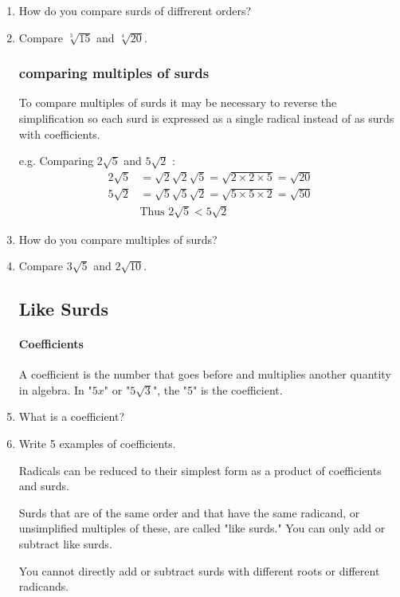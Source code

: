 \documentclass{article}
\begin{document}
\begin{enumerate}
\item How do you compare surds of diffrerent orders?
\item Compare $\sqrt[3]{15}$ and $\sqrt[4]{20}$.

\subsubsection*{comparing multiples of surds}
To compare multiples of surds it may be necessary to reverse the simplification so each surd is expressed as a single radical instead of as surds with coefficients.

e.g. Comparing $2\sqrt{5}$ and $5\sqrt{2}$ :
\begin{align*}
2\sqrt{5}&=\sqrt{2}\sqrt{2}\sqrt{5}=\sqrt{2\times2\times5}=\sqrt{20}\\
5\sqrt{2}&=\sqrt{5}\sqrt{5}\sqrt{2}=\sqrt{5\times{5\times{2}}}=\sqrt{50}\\
&\text{Thus }2\sqrt{5}<5\sqrt{2}
\end{align*}

\item How do you compare multiples of surds?
\item Compare $3\sqrt{5}$ and $2\sqrt{10}$.

\subsection*{Like Surds}

\paragraph{Coefficients}
A coefficient is the number that goes before and multiplies another quantity in algebra. In "$5x$" or "$5\sqrt{3}$", the "5" is the coefficient.

\item What is a coefficient?
\item Write 5 examples of coefficients.

Radicals can be reduced to their simplest form as a product of coefficients and surds.

Surds that are of the same order and that have the same radicand, or unsimplified multiples of these, are called "like surds." You can only add or subtract like surds.

You cannot directly add or subtract surds with different roots or different radicands.


\end{enumerate}
\end{document}
